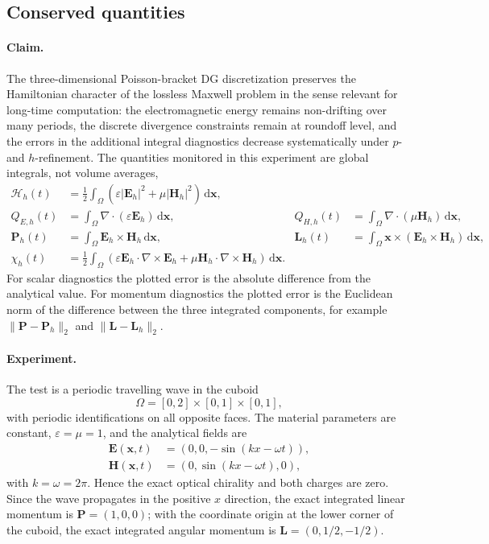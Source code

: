 \documentclass[11pt]{article}
\newcommand{\dd}{\,\mathrm{d}}
\newcommand{\bbE}{\mathbf{E}}
\newcommand{\bbH}{\mathbf{H}}
\newcommand{\bbP}{\mathbf{P}}
\newcommand{\bbL}{\mathbf{L}}
\newcommand{\bbx}{\mathbf{x}}
\newcommand{\calH}{\mathcal{H}}
\begin{document}
\subsection{Conserved quantities}
\label{subsec:results_conserved_quantities}

\paragraph{Claim.}
The three-dimensional Poisson-bracket DG discretization preserves the
Hamiltonian character of the lossless Maxwell problem in the sense relevant for
long-time computation: the electromagnetic energy remains non-drifting over many
periods, the discrete divergence constraints remain at roundoff level, and the
errors in the additional integral diagnostics decrease systematically under
$p$- and $h$-refinement.  The quantities monitored in this experiment are global
integrals, not volume averages,
\begin{align}
  \calH_h(t)
    &= \frac12 \int_{\Omega}
       \left(\varepsilon |\bbE_h|^2 + \mu |\bbH_h|^2 \right)\dd \bbx, \\
  Q_{E,h}(t)
    &= \int_{\Omega} \nabla\cdot(\varepsilon \bbE_h)\dd \bbx,
  &
  Q_{H,h}(t)
    &= \int_{\Omega} \nabla\cdot(\mu \bbH_h)\dd \bbx, \\
  \bbP_h(t)
    &= \int_{\Omega} \bbE_h\times \bbH_h \dd \bbx,
  &
  \bbL_h(t)
    &= \int_{\Omega} \bbx\times(\bbE_h\times \bbH_h)\dd \bbx, \\
  \chi_h(t)
    &= \frac12\int_{\Omega}
       \left(\varepsilon \bbE_h\cdot\nabla\times\bbE_h
       + \mu \bbH_h\cdot\nabla\times\bbH_h\right)\dd \bbx .
\end{align}
For scalar diagnostics the plotted error is the absolute difference from the
analytical value.  For momentum diagnostics the plotted error is the Euclidean
norm of the difference between the three integrated components, for example
$\|\bbP-\bbP_h\|_2$ and $\|\bbL-\bbL_h\|_2$.

\paragraph{Experiment.}
The test is a periodic travelling wave in the cuboid
\[
  \Omega = [0,2]\times[0,1]\times[0,1],
\]
with periodic identifications on all opposite faces.  The material parameters
are constant, $\varepsilon=\mu=1$, and the analytical fields are
\begin{align}
  \bbE(\bbx,t) &= \left(0,0,-\sin(kx-\omega t)\right), \\
  \bbH(\bbx,t) &= \left(0,\sin(kx-\omega t),0\right),
\end{align}
with $k=\omega=2\pi$.  Hence the exact optical chirality and both charges are
zero.  Since the wave propagates in the positive $x$ direction, the exact
integrated linear momentum is $\bbP=(1,0,0)$; with the coordinate origin at the
lower corner of the cuboid, the exact integrated angular momentum is
$\bbL=(0,1/2,-1/2)$.
\end{document}
